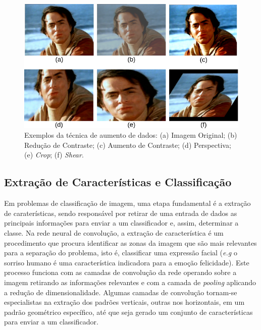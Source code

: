 \begin{figure}
\centering
\includegraphics[scale=0.46]{figuras/augmentation.png}
\caption{Exemplos da técnica de aumento de dados: (a) Imagem Original; (b) Redução de Contraste; (c) Aumento de Contraste; (d) Perspectiva; (e) \textit{Crop}; (f) \textit{Shear}. }
\label{fig:aumentoDados}
\end{figure}


\subsection{Extração de Características e Classificação}
Em problemas de classificação de imagem, uma etapa fundamental é a extração de caraterísticas, sendo responsável por retirar de uma entrada de dados as principais informações para enviar a um classificador e, assim, determinar a classe. Na rede neural de convolução, a extração de característica é um procedimento que procura identificar as zonas da imagem que são mais relevantes para a separação do problema, isto é, classificar uma expressão facial (\textit{e.g} o sorriso humano é uma característica indicadora para a emoção felicidade). Este processo funciona com as camadas de convolução da rede operando sobre a imagem retirando as informações relevantes e com a camada de \textit{pooling} aplicando a redução de dimensionalidade. Algumas camadas de convolução tornam-se especialistas na extração dos padrões verticais, outras nos horizontais, em um padrão geométrico específico, até que seja gerado um conjunto de características para enviar a um classificador.

